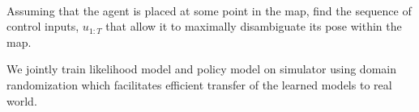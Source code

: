 \documentclass[a0]{a0poster}
\def\Head#1{\begin{center}\noindent{\LARGE\bf\color{Black}#1}\end{center}\bigskip}
\begin{document}
\hspace{2cm}
\vspace{2cm}
\\
\begin{minipage}{1.\textwidth}
    {\color{Black}{\vrule depth 0pt height 0.3cm width \columnwidth}}
    \vspace{0.5cm}
\end{minipage}
\hfill
\begin{minipage}[t]{0.32\textwidth}
    \Head{Overview}
    \vspace{1cm}
    \begin{minipage}{1.0\columnwidth}
        \Large
{}Assuming that the agent is placed at some point in the map, find the sequence of control inputs, $u_{1:T}$ that allow it to maximally disambiguate its pose within the map.



{}
We jointly train likelihood model and policy model on simulator using domain randomization which facilitates efficient transfer of the learned models to real world.
        \vspace{1cm}
    \end{minipage}


\end{minipage}
\end{document}
